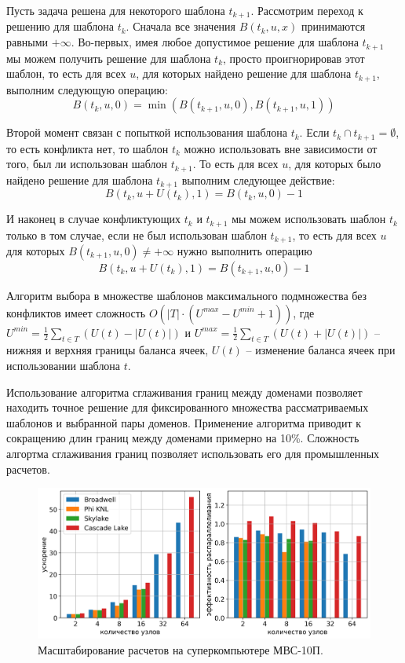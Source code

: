 \documentclass[a4paper,14pt]{extarticle}                     %
\theoremstyle{plain}                                         %
\begin{document}
Пусть задача решена для некоторого шаблона $t_{k + 1}$.
Рассмотрим переход к решению для шаблона $t_k$.
Сначала все значения $B(t_k, u, x)$ принимаются равными $+\infty$.
Во-первых, имея любое допустимое решение для шаблона $t_{k + 1}$ мы можем получить решение для шаблона $t_k$, просто проигнорировав этот шаблон, то есть для всех $u$, для которых найдено решение для шаблона $t_{k + 1}$, выполним следующую операцию:
\begin{equation*}
	B(t_k, u, 0) = \min \left( B(t_{k + 1}, u, 0), B(t_{k + 1}, u, 1) \right)
\end{equation*}

Второй момент связан с попыткой использования шаблона $t_k$.
Если $t_k \cap t_{k + 1} = \emptyset$, то есть конфликта нет, то шаблон $t_k$ можно использовать вне зависимости от того, был ли использован шаблон $t_{k + 1}$.
То есть для всех $u$, для которых было найдено решение для шаблона $t_{k + 1}$ выполним следующее действие:
\begin{equation*}
	B(t_k, u + U(t_k), 1) = B(t_k, u, 0) - 1
\end{equation*}

И наконец в случае конфликтующих $t_k$ и $t_{k + 1}$ мы можем использовать шаблон $t_k$ только в том случае, если не был использован шаблон $t_{k + 1}$, то есть для всех $u$ для которых $B(t_{k + 1}, u, 0) \ne +\infty$ нужно выполнить операцию
\begin{equation*}
	B(t_k, u + U(t_k), 1) = B(t_{k + 1}, u, 0) - 1
\end{equation*}

Алгоритм выбора в множестве шаблонов максимального подмножества без конфликтов имеет сложность $O \left( |T| \cdot (U^{max} - U^{min} + 1) \right)$, где $U^{min} = \frac{1}{2} \sum_{t \in T}{(U(t) - |U(t)|)}$ и $U^{max} = \frac{1}{2} \sum_{t \in T}{(U(t) + |U(t)|)}$ -- нижняя и верхняя границы баланса ячеек, $U(t)$ -- изменение баланса ячеек при использовании шаблона $t$.

Использование алгоритма сглаживания границ между доменами позволяет находить точное решение для фиксированного множества рассматриваемых шаблонов и выбранной пары доменов.
Применение алгоритма приводит к сокращению длин границ между доменами примерно на 10\%.
Сложность алгортма сглаживания границ позволяет использовать его для промышленных расчетов.

\begin{figure}[!ht]
\centering
\includegraphics[width=1.0\textwidth]{pics/text_2_scaling/2in1_big.png}
\singlespacing
\caption{Масштабирование расчетов на суперкомпьютере МВС-10П.}
\label{fig:text_2_scaling_speedup_eff}
\end{figure}
\end{document}

